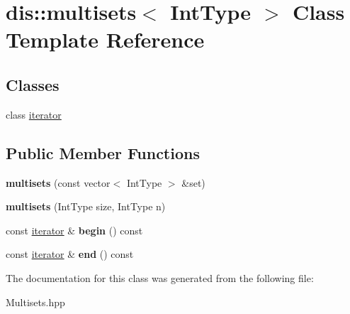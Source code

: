 \hypertarget{classdis_1_1multisets}{\section{dis\-:\-:multisets$<$ Int\-Type $>$ Class Template Reference}
\label{classdis_1_1multisets}
}
\subsection*{Classes}
\begin{DoxyCompactItemize}
\item 
class \hyperlink{classdis_1_1multisets_1_1iterator}{iterator}
\end{DoxyCompactItemize}
\subsection*{Public Member Functions}
\begin{DoxyCompactItemize}
\item 
\hypertarget{classdis_1_1multisets_abac8beece3a28e8d66a89f5845670017}{{\bfseries multisets} (const vector$<$ Int\-Type $>$ \&set)}\label{classdis_1_1multisets_abac8beece3a28e8d66a89f5845670017}

\item 
\hypertarget{classdis_1_1multisets_aac96c828540af35af037662cdcf02488}{{\bfseries multisets} (Int\-Type size, Int\-Type n)}\label{classdis_1_1multisets_aac96c828540af35af037662cdcf02488}

\item 
\hypertarget{classdis_1_1multisets_a281f72ecfc7f6c71726af12a462f6a93}{const \hyperlink{classdis_1_1multisets_1_1iterator}{iterator} \& {\bfseries begin} () const }\label{classdis_1_1multisets_a281f72ecfc7f6c71726af12a462f6a93}

\item 
\hypertarget{classdis_1_1multisets_a1179fd608ed8a39a261ca83ee153534b}{const \hyperlink{classdis_1_1multisets_1_1iterator}{iterator} \& {\bfseries end} () const }\label{classdis_1_1multisets_a1179fd608ed8a39a261ca83ee153534b}

\end{DoxyCompactItemize}


The documentation for this class was generated from the following file\-:\begin{DoxyCompactItemize}
\item 
Multisets.\-hpp\end{DoxyCompactItemize}
